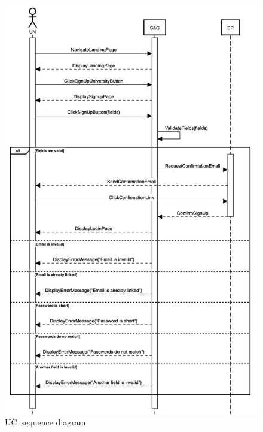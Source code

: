 \begin{figure}
    \centering
    \includegraphics[width=13cm]{images/sequence-diagrams/university-signs-up.png}
    \caption{UC\theuc\ sequence diagram}
\end{figure}


